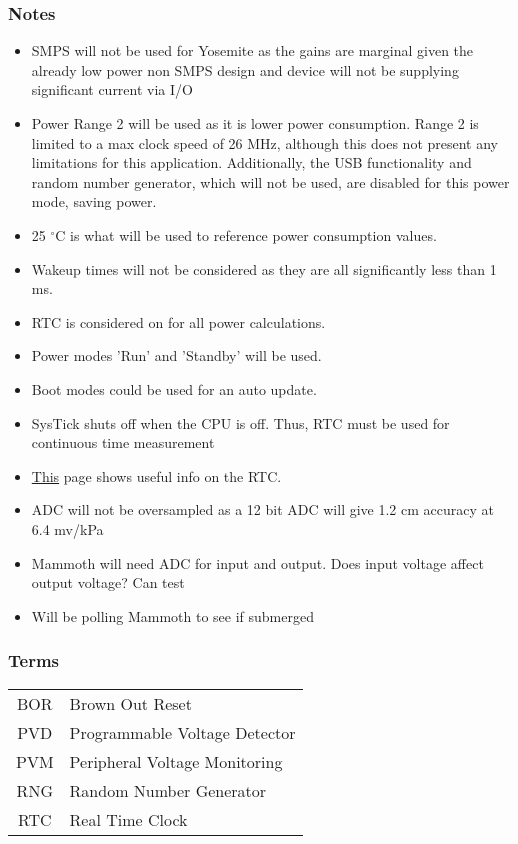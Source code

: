 \documentclass{article}
\begin{document}
\subsubsection{Notes}
\begin{itemize}
    \item SMPS will not be used for Yosemite as the gains are marginal given the already low power non SMPS design and device will not be supplying significant current via I/O
    \item Power Range 2 will be used as it is lower power consumption. Range 2 is limited to a max clock speed of 26 MHz, although this does not present any limitations for this application. Additionally, the USB functionality and random number generator, which will not be used, are disabled for this power mode, saving power.
    \item 25 $^\circ$C is what will be used to reference power consumption values.
    \item Wakeup times will not be considered as they are all significantly less than 1 ms.
    \item RTC is considered on for all power calculations.
    \item Power modes 'Run' and 'Standby' will be used. 
    \item Boot modes could be used for an auto update.
    \item SysTick shuts off when the CPU is off. Thus, RTC must be used for continuous time measurement
    \item \href{http://embedded-lab.com/blog/stm32s-internal-rtc/}{This} page shows useful info on the RTC.
    \item ADC will not be oversampled as a 12 bit ADC will give 1.2 cm accuracy at 6.4 mv/kPa
    \item Mammoth will need ADC for input and output. Does input voltage affect output voltage? Can test
    \item Will be polling Mammoth to see if submerged
\end{itemize}


\subsubsection{Terms}
\begin{tabular}{c l}
    BOR & Brown Out Reset\\
    PVD & Programmable Voltage Detector\\
    PVM & Peripheral Voltage Monitoring\\
    RNG & Random Number Generator\\
    RTC & Real Time Clock
\end{tabular}
\vspace{1em}
\end{document}
